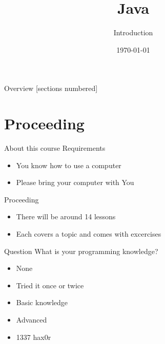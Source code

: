 


\title{Java}
\subtitle{Introduction}
\date{\today}






\begin{frame}
	\titlepage
\end{frame}
\begin{frame}{Overview}
	[sections numbered]
	\tableofcontents
\end{frame}

\section{Proceeding}
\begin{frame}{About this course}
	Requirements
	\begin{itemize}
		\item You know how to use a computer
        \item Please bring your computer with You
	\end{itemize}
	Proceeding
	\begin{itemize}
		\item There will be around 14 lessons
		\item Each covers a topic and comes with excercises
	\end{itemize}
\end{frame}

\begin{frame}{Question}
	What is your programming knowledge?
	\begin{itemize}
		\item None
		\item Tried it once or twice
		\item Basic knowledge
		\item Advanced
		\item 1337 hax0r
	\end{itemize}
\end{frame}

